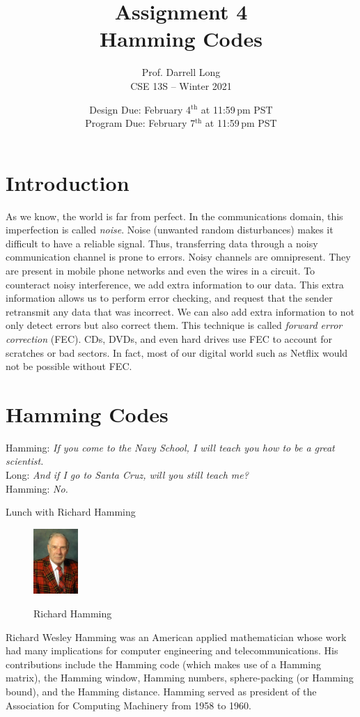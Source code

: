 \documentclass[11pt]{article}
\title{Assignment 4 \\ Hamming Codes}
\author{Prof. Darrell Long \\ CSE 13S -- Winter 2021}
\date{
Design Due: February 4$^\text{th}$ at 11:59\,pm PST \\
Program Due: February 7$^\text{th}$ at 11:59\,pm PST
}
\begin{document}
\maketitle

\section{Introduction}
As we know, the world is far from perfect. In the communications domain, this imperfection is called \emph{noise}.
Noise (unwanted random disturbances) makes it difficult to have a reliable signal. Thus,
transferring data through a noisy communication channel is prone to errors. Noisy channels are omnipresent.
They are present in mobile phone networks and even the wires in a circuit. To counteract noisy
interference, we add extra information to our data. This extra information allows us to perform error checking,
and request that the sender retransmit any data that was incorrect. We can also add extra information to not only
detect errors but also correct them. This technique is called \emph{forward error correction} (FEC). CDs, DVDs, and even hard
drives use FEC to account for scratches or bad sectors. In fact, most of our digital world such as Netflix
would not be possible without FEC.

\section{Hamming Codes}

\textwidth
\epigraph{
Hamming: \emph{If you come to the Navy School, I will teach you how to be a great scientist.}\\
Long: \emph{And if I go to Santa Cruz, will you still teach me?}\\
Hamming: \emph{No.}}{Lunch with Richard Hamming}

\begin{figure}
\includegraphics[width=0.15\textwidth]{images/hamming.jpeg}
\centerline{\small Richard Hamming}
\end{figure}

Richard Wesley Hamming  was an American applied mathematician whose work
had many implications for computer engineering and telecommunications.
His contributions include the Hamming code (which makes use of a
Hamming matrix), the Hamming window, Hamming numbers, sphere-packing
(or Hamming bound), and the Hamming distance.
Hamming served as president of the Association for Computing Machinery from 1958 to 1960.
\end{document}
